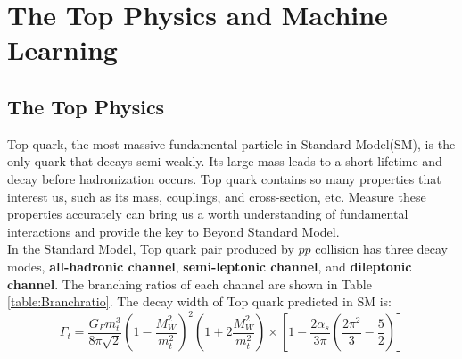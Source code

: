 
\chapter{The Top Physics and Machine Learning}

\section{The Top Physics}

Top quark, the most massive fundamental particle in Standard Model(SM), is the only quark that decays semi-weakly. Its large mass leads to a short lifetime and decay before hadronization occurs. Top quark contains so many properties that interest us, such as its mass, couplings, and cross-section, etc. Measure these properties accurately can bring us a worth understanding of fundamental interactions and provide the key to Beyond Standard Model.\cite{Zyla:2020zbs}
\\
In the Standard Model, Top quark pair produced by $pp$ collision has three decay modes, \textbf{all-hadronic channel}, \textbf{semi-leptonic channel}, and \textbf{dileptonic channel}. The branching ratios of each channel are shown in Table \ref{table:Branchratio}. The decay width of Top quark predicted in SM is\cite{A.Quadt:2008TopPhysics}: 
\begin{equation}
	\Gamma_{t} = \frac{G_{F}m_{t}^{3}}{8\pi\sqrt{2}}\left(1-\frac{M_{W}^{2}}{m_{t}^{2}}\right)^{2}\left(1+2\frac{M_{W}^{2}}{m_{t}^{2}}\right)\times\left[1 - \frac{2\alpha_{s}}{3\pi}\left( \frac{2\pi^{2}}{3} - \frac{5}{2}\right) \right]
\end{equation}
\\

